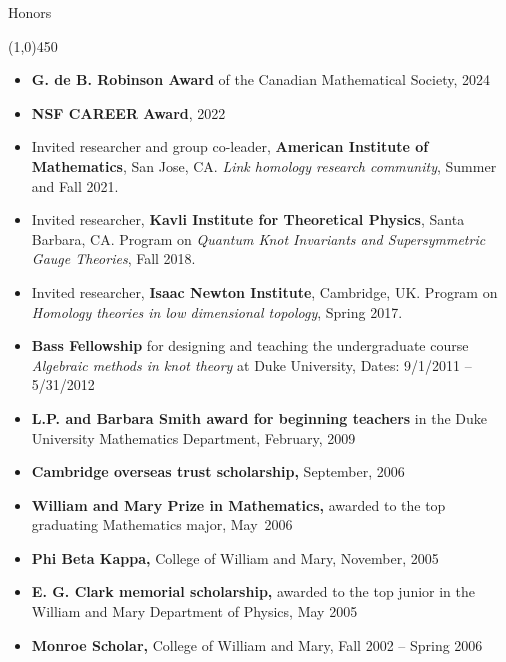 \documentclass[10pt]{article}
\begin{document}
\newpage
\noindent
{\large \sc Honors}

\vspace{-0.1in}
\noindent
\line(1,0){450}

\smallskip

\begin{itemize}

\item \textbf{G. de B. Robinson Award} of the Canadian Mathematical Society,
2024

\item \textbf{NSF CAREER Award}, 2022

\item Invited researcher and group co-leader, {\bf American Institute of Mathematics}, San Jose, CA. 
\emph{Link homology research community}, Summer and Fall 2021.

\item Invited researcher, {\bf Kavli Institute for Theoretical Physics}, Santa Barbara, CA. 
Program on \emph{Quantum Knot Invariants and Supersymmetric Gauge Theories}, Fall 2018.

\item Invited researcher, {\bf Isaac Newton Institute}, Cambridge, UK.
Program on \emph{Homology theories in low dimensional topology}, Spring 2017.

\item {\bf Bass Fellowship} for designing and teaching the undergraduate course 
\emph{Algebraic methods in knot theory} at Duke University, 
Dates: 9/1/2011 -- 5/31/2012


\item {\bf L.P. and Barbara Smith award for beginning teachers} 
in the Duke University Mathematics Department, 
February, 2009
 
\item {\bf Cambridge overseas trust scholarship,} September, 2006
 
\item {\bf William and Mary Prize in Mathematics,} 
awarded to the top graduating Mathematics major, May~2006
 
\item {\bf Phi Beta Kappa,} College of William and Mary, November, 2005

\item {\bf E. G. Clark memorial scholarship,} 
awarded to the top junior in the William and Mary Department of Physics, May 2005

\item {\bf Monroe Scholar,} College of William and Mary, Fall 2002 -- Spring 2006 

\end{itemize}
\end{document}
